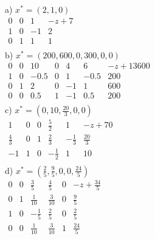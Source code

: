 \begin{enumerate}
    \begin{solution}
      a) $x^{*} = (2,1,0)$ \\
      \newline
      $\begin{array}
      {ccc|l}
      0 & 0 & 1 & -z+7\\ \hline
      1 & 0 & -1 & 2 \\
      0 & 1 & 1 & 1
      \\\end{array}$ \\
      \newline
      \newline
      b) $ x^{*} = (200,600,0,300,0,0)$ \\
      \newline
      $\begin{array}
      {cccccc|l}
      0 & 0 & 10 & 0 & 4 & 6 & -z + 13600 \\  \hline
      1 & 0 & -0.5 & 0 & 1 & -0.5 & 200 \\
      0 & 1 & 2 & 0 & -1 & 1 & 600 \\
      0 & 0 & 0.5 & 1 & -1 & 0.5 & 200
      \\\end{array}$\\
      \newline
      \newline
      c) $x^{*} = (0,10,\frac{20}{3}, 0,0)$ \\
      \newline
      $\begin{array}
      {ccccc|l}
      1 & 0 & 0 & \frac{5}{2} & 1 & -z +70 \\ \hline
      \frac{4}{3} & 0 & 1 & \frac{2}{3} & -\frac{1}{3} & \frac{20}{3} \\
      -1 & 1 & 0 & - \frac{1}{2} & 1 & 10
      \\\end{array}$\\
      \newline
      \newline
      d) $x^{*} = (\frac{2}{5}, \frac{9}{5}, 0,0,\frac{24}{5})$ \\
      \newline
      $\begin{array}
      {ccccc|l}
      0 & 0 & \frac{3}{5} & \frac{4}{5} & 0 & - z + \frac{34}{5} \\ \hline
      0 & 1 & \frac{1}{10} & \frac{3}{10} & 0 & \frac{9}{5} \\
      1 & 0 & -\frac{1}{5} & \frac{2}{5} & 0 & \frac{2}{5} \\
      0 & 0 & \frac{1}{10} & \frac{3}{10} & 1 & \frac{24}{5}
      \\\end{array}$\\
      \newline
      \newline
    \end{solution}


\end{enumerate}
